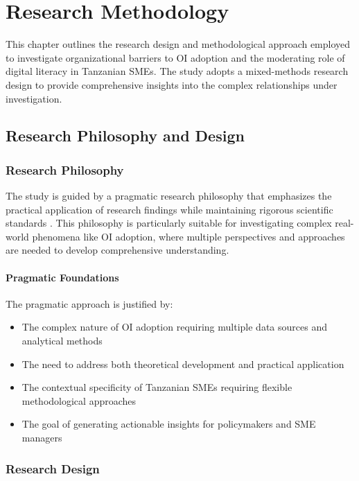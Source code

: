 \chapter{Research Methodology}

This chapter outlines the research design and methodological approach employed to investigate organizational barriers to OI adoption and the moderating role of digital literacy in Tanzanian SMEs. The study adopts a mixed-methods research design to provide comprehensive insights into the complex relationships under investigation.

\section{Research Philosophy and Design}

\subsection{Research Philosophy}

The study is guided by a pragmatic research philosophy that emphasizes the practical application of research findings while maintaining rigorous scientific standards \citep{creswell2018research}. This philosophy is particularly suitable for investigating complex real-world phenomena like OI adoption, where multiple perspectives and approaches are needed to develop comprehensive understanding.

\subsubsection{Pragmatic Foundations}
The pragmatic approach is justified by:
\begin{itemize}
    \item The complex nature of OI adoption requiring multiple data sources and analytical methods
    \item The need to address both theoretical development and practical application
    \item The contextual specificity of Tanzanian SMEs requiring flexible methodological approaches
    \item The goal of generating actionable insights for policymakers and SME managers
\end{itemize}

\subsection{Research Design}

